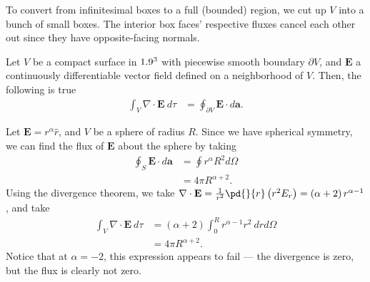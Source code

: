 \documentclass[10pt]{mypackage}
\begin{document}
To convert from infinitesimal boxes to a full (bounded) region, we cut up $V$ into a bunch of small boxes. The interior box faces' respective fluxes cancel each other out since they have opposite-facing normals.
\begin{theorem}
    Let $V$ be a compact surface in $1.9^3$ with piecewise smooth boundary $\partial V$, and $\mathbf{E}$ a continuously differentiable vector field defined on a neighborhood of $V$. Then, the following is true
  \begin{align*}
    \int_{V}^{} \nabla \cdot \mathbf{E}\:d\tau &= \oint_{\partial V}^{} \mathbf{E}\cdot d\mathbf{a}.
  \end{align*}
\end{theorem}
\begin{example}
  Let $\mathbf{E} = r^{\alpha}\widehat{r}$, and $V$ be a sphere of radius $R$. Since we have spherical symmetry, we can find the flux of $\mathbf{E}$ about the sphere by taking
  \begin{align*}
    \oint_{S}\mathbf{E}\cdot d\mathbf{a} &= \oint r^{\alpha}R^2d\Omega\\
                                         &= 4\pi R^{\alpha + 2}.
  \end{align*}
  Using the divergence theorem, we take $\nabla \cdot \mathbf{E} = \frac{1}{r^2}\pd{}{r}\left(r^2E_{r}\right) = \left(\alpha + 2\right)r^{\alpha - 1}$, and take
  \begin{align*}
    \int_{V}^{} \nabla \cdot \mathbf{E}\:d\tau &= \left(\alpha + 2\right)\int_{0}^{R} r^{\alpha - 1}r^{2}\:drd\Omega\\
                                               &= 4\pi R^{\alpha + 2}.
  \end{align*}
  Notice that at $\alpha = -2$, this expression appears to fail --- the divergence is zero, but the flux is clearly not zero.
\end{example}
\end{document}
